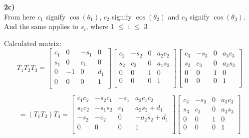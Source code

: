 \documentclass[12pt,norsk,a4paper]{article}
\begin{document}
    \textbf{2c)}\\
    From here $c_1$ signify $\cos(\theta_1)$, $c_2$ signify $\cos(\theta_2)$ and $c_3$ signify $\cos(\theta_3)$. And the same applies to $s_i$, where 1 $\leq$ i $\leq$ 3
   
    Calculated matrix:\\
    \[T_1T_2T_3 = 
            \left[ \begin{array}{cccc}
                c_1 & 0 & -s_1 & 0 \\
                s_1 & 0 & c_1 & 0 \\
                0 & -1 & 0 & d_1 \\
                0 & 0 & 0 & 1 \\
            \end{array} \right]
            \left[ \begin{array}{cccc}
                c_2 & -s_2 & 0 & a_2c_2 \\
                s_2 & c_2 & 0 & a_1s_2 \\
                0 & 0 & 1 & 0 \\
                0 & 0 & 0 & 1 \\
            \end{array} \right]
            \left[ \begin{array}{cccc}
                c_3 & -s_3 & 0 & a_3c_3 \\
                s_3 & c_3 & 0 & a_3s_3 \\
                0 & 0 & 1 & 0 \\
                0 & 0 & 0 & 1 \\
            \end{array} \right]\]
        

        \[= (T_1T_2)T_3 = 
        \left[ \begin{array}{cccc}
            c_1c_2 & -s_2c_1 & -s_1 & a_2c_1c_2 \\
            s_1c_2 & -s_1s_2 & c_1 & a_2s_2+d_1 \\
            -s_2 & -c_2 & 0 & -a_2s_2+d_1 \\
            0 & 0 & 0 & 1 \\
        \end{array} \right]
        \left[ \begin{array}{cccc}
            c_3 & -s_3 & 0 & a_3c_3 \\
            s_3 & c_3 & 0 & a_3s_3 \\
            0 & 0 & 1 & 0 \\
            0 & 0 & 0 & 1 \\
        \end{array} \right]\]
\end{document}
